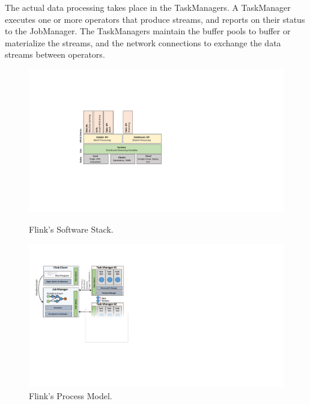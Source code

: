 The actual data processing takes place in the TaskManagers. A TaskManager executes one or more operators that produce streams, and reports on their status to the JobManager. The TaskManagers maintain the buffer pools to buffer or materialize the streams, and the network connections to exchange the data streams between operators.


\begin{figure}
\centering
\begin{minipage}{0.49\textwidth}
\centering
\includegraphics[width=.88\textwidth]{figs/stack.pdf}
\label{fig:FlinkStack}
\caption{Flink's Software Stack.}
\end{minipage}
\begin{minipage}{.49\textwidth}
\centering
	\includegraphics[width=.95\textwidth]{figs/architecture.pdf}
    \caption{Flink's Process Model.}
    \label{fig:process-model}
\end{minipage}%
\end{figure}




